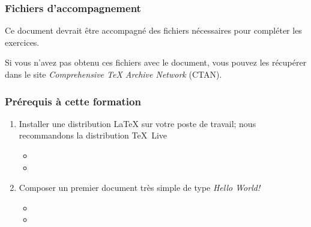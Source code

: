 \begin{frame}
  \frametitle{Fichiers d'accompagnement}

  \begin{adjustwidth}{10mm}{10mm}
    Ce document devrait être accompagné des fichiers nécessaires pour
    compléter les exercices.

    Si vous n'avez pas obtenu ces fichiers avec le document, vous
    pouvez les récupérer dans le site \emph{Comprehensive TeX Archive
      Network} (CTAN).

    \begin{center}
    \end{center}
  \end{adjustwidth}
\end{frame}

\begin{frame}
  \frametitle{Prérequis à cette formation}

  \begin{adjustwidth}{8mm}{10mm}
    \begin{enumerate}
    \item Installer une distribution {\LaTeX} sur votre poste de
      travail; nous recommandons la distribution {\TeX}~Live
      \begin{itemize}
      \item {}
      \item {}
      \end{itemize}
    \item Composer un premier document très simple de type \emph{Hello
        World!}
      \begin{itemize}
        \normalsize
      \item {}
      \item {}
      \end{itemize}
    \end{enumerate}
  \end{adjustwidth}
\end{frame}

